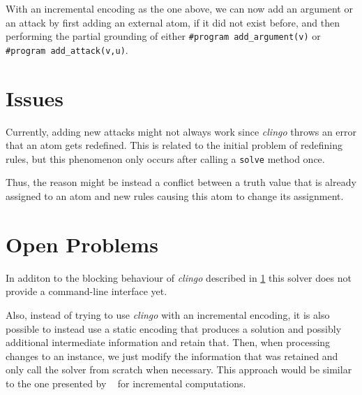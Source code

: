 \documentclass[oneside,12pt]{amsart}
\begin{document}
With an incremental encoding as the one above, we can now add 
an argument or an attack by first adding an external atom,
if it did not exist before, and then performing the partial grounding 
of either \texttt{\#program add\_argument(v)} or \texttt{\#program add\_attack(v,u)}.

\section{Issues}\label{issues}
Currently, adding new attacks might not always work since \emph{clingo} 
throws an error that an atom gets redefined. This is related to the initial 
problem of redefining rules, but this phenomenon only occurs 
after calling a \texttt{solve} method once. 

Thus, the reason might be instead a conflict between a truth value 
that is already assigned to an atom and new rules causing this atom 
to change its assignment.


\section{Open Problems}\label{problems}
In additon to the blocking behaviour of \emph{clingo} described in \cref{issues} 
this solver does not provide a command-line interface yet.

Also, instead of trying to use \emph{clingo} with an incremental encoding, 
it is also possible to instead use a static encoding that produces a solution 
and possibly additional intermediate information and retain that. 
Then, when processing changes to an instance, we just modify the information 
that was retained and only call the solver from scratch when necessary.
This approach would be similar to the one presented by \citeauthor{mans_incremental_2017}~\cite{mans_incremental_2017}
for incremental computations.

\printbibliography
\end{document}
